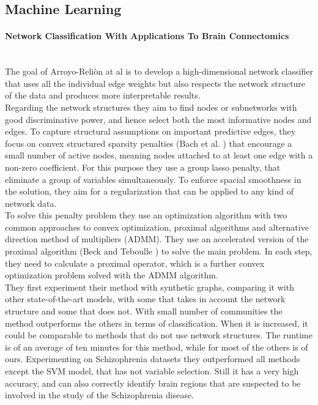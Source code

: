 \subsection{Machine Learning}
\paragraph{Network Classification With Applications To Brain Connectomics}\
\label{par:3}
\\

The goal of Arroyo-Reliòn at al \cite{Arroyo_Reli_n_2019} is to develop a high-dimensional network classifier that uses all the individual edge weights but also respects the network structure of the data and produces more interpretable results. 
\\

Regarding the network structures they aim to find nodes or subnetworks with good discriminative power, and hence select both the most informative nodes and edges. To capture structural assumptions on important predictive edges, they focus on convex structured sparsity penalties (Bach et al. \cite{bach2012structured}) that encourage a small number of active nodes, meaning nodes attached to at least one edge with a non-zero coefficient. For this purpose they use a group lasso penalty, that eliminate a group of variables simultaneously. To enforce spacial smoothness in the solution, they aim for a regularization that can be applied to any kind of network data.
\\

To solve this penalty problem they use an optimization algorithm with two common approaches to convex optimization, proximal algorithms and alternative direction method of multipliers (ADMM). They use an accelerated version of the proximal algorithm (Beck and Teboulle \cite{beck2009fast}) to solve the main problem. In each step, they need to calculate a proximal operator, which is a further convex optimization problem solved with the ADMM algorithm.
\\

They first experiment their method with synthetic graphs, comparing it with other state-of-the-art models, with some that takes in account the network structure and some that does not. With small number of communities the method outperforms the others in terms of classification. When it is increased, it could be comparable to methods that do not use network structures. The runtime is of an average of ten minutes for this method, while for most of the others is of ours. 
Experimenting on Schizophrenia datasets they outperformed all methods except the SVM model, that has not variable selection. Still it has a very high accuracy, and can also correctly identify brain regions that are suspected to be involved in the study of the Schizophrenia disease. 

